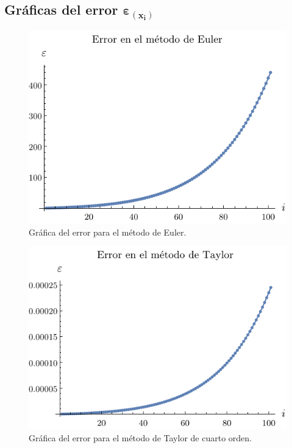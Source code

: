 \documentclass[
    english, spanish, Ce-table, Ce-theorem
]{CabesHW}
\begin{document}
\vspace{1em}
\subsection[Gráficas del error]{Gráficas del error $\boldsymbol{\varepsilon_{(x_i)}}$}
\begin{figure}[H]
    \centering
    \includegraphics{imgs/plot-euler.pdf}
    \caption{Gráfica del error para el método de Euler.}
    \label{fig:euler}
\end{figure}

\begin{figure}[H]
    \centering
    \includegraphics{imgs/plot-taylor.pdf}
    \caption{Gráfica del error para el método de Taylor de cuarto orden.}
    \label{fig:taylor}
\end{figure}
\end{document}
